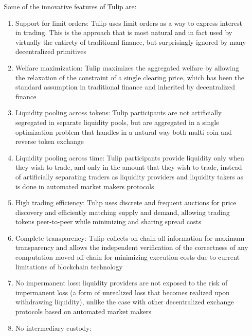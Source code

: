 \documentclass[11pt, reqno]{amsart}
\theoremstyle{definition}
\theoremstyle{remark}
\begin{document}
Some of the innovative features of Tulip are:
\begin{enumerate}
    \item Support for limit orders:
          Tulip uses limit orders as a way to express interest in trading. This
          is the approach that is most natural and in fact used by virtually
          the entirety of traditional finance, but surprisingly ignored by many
          decentralized primitives
    \item Welfare maximization:
          Tulip maximizes the aggregated welfare by allowing the relaxation of
          the constraint of a single clearing price, which has been the standard
          assumption in traditional finance and inherited by decentralized
          finance
    \item Liquidity pooling across tokens:
          Tulip participants are not artificially segregated in separate liquidity
          pools, but are aggregated in a single optimization problem that
          handles in a natural way both multi-coin and reverse token exchange
    \item Liquidity pooling across time:
          Tulip participants provide liquidity only when they wish to trade, and only
          in the amount that they wish to trade, instead of artificially
          separating traders as liquidity providers and liquidity takers as is
          done  in automated market makers protocols
    \item High trading efficiency:
          Tulip uses discrete and frequent auctions for price discovery and
          efficiently matching supply and demand, allowing trading tokens
          peer-to-peer while minimizing and sharing spread costs
    \item Complete transparency:
          Tulip collects on-chain all information for maximum transparency
          and allows the independent verification of the correctness of any
          computation moved off-chain for minimizing execution costs due to
          current limitations of blockchain technology
    \item No impermanent loss:
          liquidity providers are not exposed to the risk of impermanent loss
          (a form of unrealized loss that becomes realized upon withdrawing
          liquidity), unlike the case with other decentralized exchange protocols
          based on automated market makers
    \item No intermediary custody:

\end{enumerate}
\end{document}
